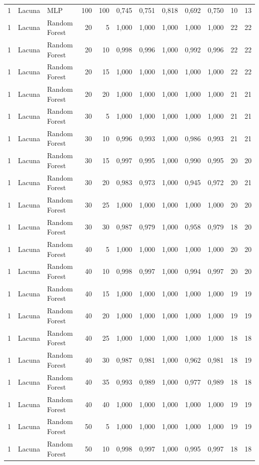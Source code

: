 \begin{longtable}{@{}rllrrrrrrrrr@{}}
1 & Lacuna & MLP & 100 & 100 & 0,745 & 0,751 & 0,818 & 0,692 & 0,750 & 10 & 13 \\
1 & Lacuna & Random Forest & 20 & 5 & 1,000 & 1,000 & 1,000 & 1,000 & 1,000 & 22 & 22 \\
1 & Lacuna & Random Forest & 20 & 10 & 0,998 & 0,996 & 1,000 & 0,992 & 0,996 & 22 & 22 \\
1 & Lacuna & Random Forest & 20 & 15 & 1,000 & 1,000 & 1,000 & 1,000 & 1,000 & 22 & 22 \\
1 & Lacuna & Random Forest & 20 & 20 & 1,000 & 1,000 & 1,000 & 1,000 & 1,000 & 21 & 21 \\
1 & Lacuna & Random Forest & 30 & 5 & 1,000 & 1,000 & 1,000 & 1,000 & 1,000 & 21 & 21 \\
1 & Lacuna & Random Forest & 30 & 10 & 0,996 & 0,993 & 1,000 & 0,986 & 0,993 & 21 & 21 \\
1 & Lacuna & Random Forest & 30 & 15 & 0,997 & 0,995 & 1,000 & 0,990 & 0,995 & 20 & 20 \\
1 & Lacuna & Random Forest & 30 & 20 & 0,983 & 0,973 & 1,000 & 0,945 & 0,972 & 20 & 21 \\
1 & Lacuna & Random Forest & 30 & 25 & 1,000 & 1,000 & 1,000 & 1,000 & 1,000 & 20 & 20 \\
1 & Lacuna & Random Forest & 30 & 30 & 0,987 & 0,979 & 1,000 & 0,958 & 0,979 & 18 & 20 \\
1 & Lacuna & Random Forest & 40 & 5 & 1,000 & 1,000 & 1,000 & 1,000 & 1,000 & 20 & 20 \\
1 & Lacuna & Random Forest & 40 & 10 & 0,998 & 0,997 & 1,000 & 0,994 & 0,997 & 20 & 20 \\
1 & Lacuna & Random Forest & 40 & 15 & 1,000 & 1,000 & 1,000 & 1,000 & 1,000 & 19 & 19 \\
1 & Lacuna & Random Forest & 40 & 20 & 1,000 & 1,000 & 1,000 & 1,000 & 1,000 & 19 & 19 \\
1 & Lacuna & Random Forest & 40 & 25 & 1,000 & 1,000 & 1,000 & 1,000 & 1,000 & 18 & 18 \\
1 & Lacuna & Random Forest & 40 & 30 & 0,987 & 0,981 & 1,000 & 0,962 & 0,981 & 18 & 19 \\
1 & Lacuna & Random Forest & 40 & 35 & 0,993 & 0,989 & 1,000 & 0,977 & 0,989 & 18 & 18 \\
1 & Lacuna & Random Forest & 40 & 40 & 1,000 & 1,000 & 1,000 & 1,000 & 1,000 & 19 & 19 \\
1 & Lacuna & Random Forest & 50 & 5 & 1,000 & 1,000 & 1,000 & 1,000 & 1,000 & 19 & 19 \\
1 & Lacuna & Random Forest & 50 & 10 & 0,998 & 0,997 & 1,000 & 0,995 & 0,997 & 18 & 18 \\

\end{longtable}
